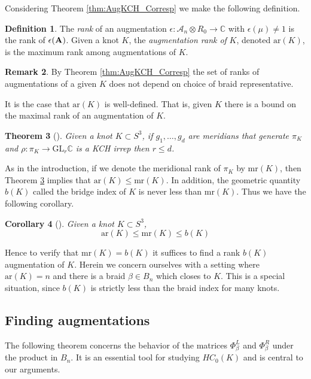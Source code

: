 \documentclass[11pt]{amsart}
\def\C{{\mathbb C}}
\def\A{{\mathcal A}}
\newtheorem{thm}{Theorem}[section]
\newtheorem{cor}[thm]{Corollary}
\theoremstyle{definition}
\newtheorem{defn}[thm]{Definition}
\newtheorem{rem}[thm]{Remark}
\begin{document}
  Considering Theorem \ref{thm:AugKCH_Corresp} we make the following definition.

  \begin{defn}
  The \emph{rank} of an augmentation $\epsilon:\A_n\otimes R_0\to\C$ with $\epsilon(\mu)\ne 1$ is the rank of $\epsilon({\bf A})$. Given a knot $K$, the \emph{augmentation rank of} $K$, denoted $\text{ar}(K)$, is the maximum rank among augmentations of $K$.
  \label{defn:AugRk}
  \end{defn}

  \begin{rem} By Theorem \ref{thm:AugKCH_Corresp} the set of ranks of augmentations of a given $K$ does not depend on choice of braid representative.
  \end{rem}

  It is the case that $\text{ar}(K)$ is well-defined. That is, given $K$ there is a bound on the maximal rank of an augmentation of $K$.

  \begin{thm}[\cite{Cor13b}] Given a knot $K\subset S^3$, if $g_1,\ldots,g_d$ are meridians that generate $\pi_K$ and $\rho:\pi_K\to\text{GL}_r\C$ is a KCH irrep then $r\le d$.
  \label{thm:DimBound}
  \end{thm}

  As in the introduction, if we denote the meridional rank of $\pi_K$ by $\text{mr}(K)$, then Theorem \ref{thm:DimBound} implies that $\text{ar}(K)\le\text{mr}(K)$. In addition, the geometric quantity $b(K)$ called the bridge index of $K$ is never less than $\text{mr}(K)$. Thus we have the following corollary.
    
\begin{cor}[\cite{Cor13b}] Given a knot $K\subset S^3$,
$$\text{ar}(K)\le\text{mr}(K)\le b(K)$$
\label{cor:DimBound}
\end{cor}

  Hence to verify that $\text{mr}(K)=b(K)$ it suffices to find a rank $b(K)$ augmentation of $K$. Herein we concern ourselves with a setting where $\text{ar}(K)=n$ and there is a braid $\beta\in B_n$ which closes to $K$. This is a special situation, since $b(K)$ is strictly less than the braid index for many knots.

\subsection{Finding augmentations}
\label{SecBG_AugExist}
  The following theorem concerns the behavior of the matrices $\Phi_\beta^L$ and $\Phi_\beta^R$ under the product in $B_n$. It is an essential tool for studying $HC_0(K)$ and is central to our arguments.
\end{document}
